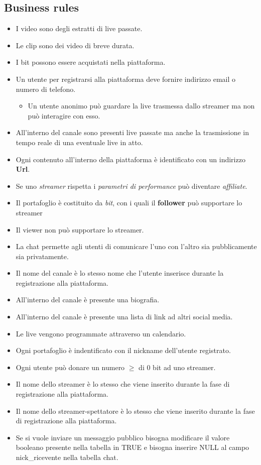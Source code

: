 \subsection{Business rules}
\begin{itemize}
    \item I video sono degli estratti di live passate.
    \item Le clip sono dei video di breve durata.
    \item I bit possono essere acquistati nella piattaforma.
    \item Un utente per registrarsi alla piattaforma deve fornire indirizzo email o numero di telefono.
    \begin{itemize}
        \item Un utente anonimo può guardare la live trasmessa dallo streamer ma non può interagire con esso. 
    \end{itemize}
    \item All'interno del canale sono presenti live passate ma anche la trasmissione in tempo reale di una eventuale live in atto.
    \item Ogni contenuto all'interno della piattaforma è identificato con un indirizzo \textbf{Url}.
        \item Se uno \textit{streamer} rispetta i \textit{parametri di performance} può diventare \textit{affiliate}.
        \item Il portafoglio è costituito da \textit{bit}, con i quali il \textbf{follower} può supportare lo streamer
        \item Il viewer non può supportare lo streamer.
        \item La chat permette agli utenti di comunicare l'uno con l'altro sia pubblicamente sia privatamente.
        \item Il nome del canale è lo stesso nome che l'utente inserisce durante la registrazione alla piattaforma.
        \item All'interno del canale è presente una biografia. 
        \item All'interno del canale è presente una lista di link ad altri social media.
        \item Le live vengono programmate attraverso un calendario.
        \item Ogni portafoglio è indentificato con il nickname dell'utente registrato. 
        \item Ogni utente può donare un numero $\geq$  di 0 bit ad uno streamer. 
        \item Il nome dello streamer è lo stesso che viene inserito durante la fase di registrazione alla piattaforma.
        \item Il nome dello streamer-spettatore è lo stesso che viene inserito durante la fase di registrazione alla piattaforma.
        \item Se si vuole inviare un messaggio pubblico bisogna modificare il valore booleano presente nella tabella in TRUE e bisogna inserire NULL al campo nick\_ricevente nella tabella chat.
\end{itemize}